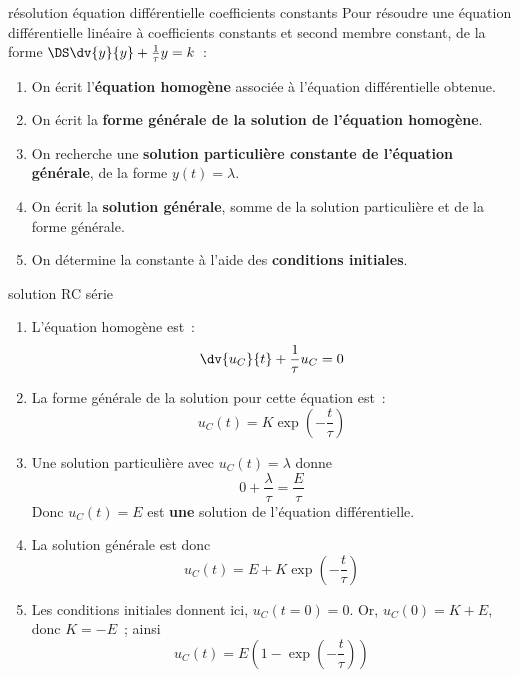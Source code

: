 \documentclass[../main/main.tex]{subfiles}
\begin{document}
\begin{tcbraster}[raster columns=2, raster equal height=rows]
\begin{tcolorbox}[blankest, raster multicolumn=1, space to=\myspace]
\begin{tcbraster}[raster columns=1]
\begin{ror}[label=impo:eqres, heart]{résolution équation différentielle
                    coefficients constants}
                Pour résoudre une équation différentielle linéaire à
                coefficients constants et second membre constant, de la forme
                $\DS \dv{y}{y} + \frac{1}{\tau}y = k$~:
                \begin{enumerate}
                    \item On écrit l'\textbf{équation homogène} associée à
                        l'équation différentielle obtenue.
                    \item On écrit la \textbf{forme générale de la solution de
                        l'équation homogène}.
                    \item On recherche une \textbf{solution particulière
                        constante de l'équation générale}, de la forme $y(t) =
                        \lambda$.
                    \item On écrit la \textbf{solution générale}, somme de la
                        solution particulière et de la forme générale.
                    \item On détermine la constante à l'aide des
                        \textbf{conditions initiales}.
                \end{enumerate}
            \end{ror}
        \end{tcbraster}
    \end{tcolorbox}
    \begin{demo}[label=demo:rcsolu]{solution RC série}
        \begin{enumerate}
            \item L'équation homogène est~: \[ \dv{u_C}{t} + \frac{1}{\tau}u_C =
                0\]
            \item La forme générale de la solution pour cette équation est~:
                \[u_C(t) = K\exp\left( -\frac{t}{\tau} \right)\]
            \item Une solution particulière avec $u_C(t) = \lambda$ donne \[0 +
                \frac{\lambda}{\tau} = \frac{E}{\tau}\] Donc $u_C(t) = E$ est
                \textbf{une} solution de l'équation différentielle.
            \item La solution générale est donc \[ u_C(t) = E + K\exp \left( -
                \frac{t}{\tau} \right)\]

            \item Les conditions initiales donnent ici, $u_C(t=0) = 0$. Or,
                $u_C(0) = K + E$, donc $K=-E$~; ainsi
                \[\boxed{u_C(t) =
                E\left(1-\exp\left(-\frac{t}{\tau}\right)\right)}\]
        \end{enumerate}
    \end{demo}
\end{tcbraster}
\end{document}
